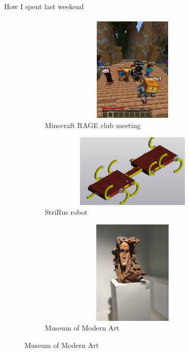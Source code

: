 \documentclass[aspectratio=169]{beamer}
\begin{document}
\begin{frame}[c]{How I spent last weekend}
    \framesubtitle{}
    \begin{figure}[H]
        \begin{subfigure}{0.25\textwidth}
            \centering\includegraphics[height=5cm,width=1\textwidth,keepaspectratio]{minecraft.jpg}
            \caption{Minecraft RAGE club meeting}
            \label{fig:minecraft.jpg}
        \end{subfigure}
        \hfill
        \begin{subfigure}{0.43\textwidth}
            \centering\includegraphics[height=3.5cm,width=1\textwidth,keepaspectratio]{strirus.jpg}
            \caption{StriRus robot}
            \label{fig:strirus.jpg}
        \end{subfigure}
        \hfill
        \begin{subfigure}{0.30\textwidth}
            \centering\includegraphics[height=5cm,width=1\textwidth,keepaspectratio, angle=-90]{museum.jpg}
            \caption{Museum of Modern Art}
            \label{fig:museum.jpg}
        \end{subfigure}
    \end{figure}
\end{frame}
\end{document}
